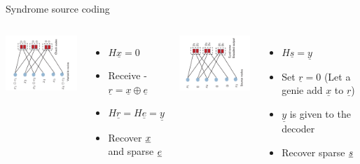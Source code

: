 \begin{frame}{Syndrome source coding}

\begin{columns}
\begin{center}
  \includegraphics[width=2.0in,angle=-90]{./Figures/syndromesourcecoding2_1}
\end{center}
\begin{itemize}
  \item $H \underline{x} = 0$
  \item Receive - $\underline{r} = \underline{x} \oplus \underline{e}$
  \item $H \underline{r} = H \underline{e} = \underline{y}$
  \item Recover $\underline{x}$ and sparse $\underline{e}$
\end{itemize}
\begin{center}
  \includegraphics[width=2.0in,angle=-90]{./Figures/syndromesourcecoding2_2}
\end{center}
\begin{itemize}
  \item $H \underline{s} = \underline{y}$
  \item Set $\underline{r} = 0 $ (Let a genie add $\underline{x}$ to $\underline{r}$)
  \item $\underline{y}$ is given to the decoder
  \item Recover sparse $\underline{s}$
\end{itemize}
\end{columns}
\end{frame}
